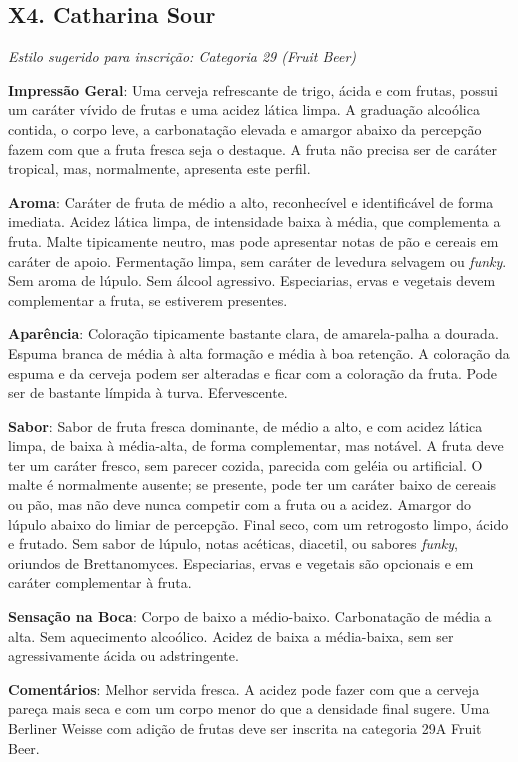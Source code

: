 \subsection*{X4. Catharina Sour}

\textit{Estilo sugerido para inscrição: Categoria 29 (Fruit Beer)}

\textbf{Impressão Geral}: Uma cerveja refrescante de trigo, ácida e com frutas, possui um caráter vívido de frutas e uma acidez lática limpa. A graduação alcoólica contida, o corpo leve, a carbonatação elevada e amargor abaixo da percepção fazem com que a fruta fresca seja o destaque. A fruta não precisa ser de caráter tropical, mas, normalmente, apresenta este perfil.

\textbf{Aroma}: Caráter de fruta de médio a alto, reconhecível e identificável de forma imediata. Acidez lática limpa, de intensidade baixa à média, que complementa a fruta. Malte tipicamente neutro, mas pode apresentar notas de pão e cereais em caráter de apoio. Fermentação limpa, sem caráter de levedura selvagem ou \textit{funky}. Sem aroma de lúpulo. Sem álcool agressivo. Especiarias, ervas e vegetais devem complementar a fruta, se estiverem presentes.

\textbf{Aparência}: Coloração tipicamente bastante clara, de amarela-palha a dourada. Espuma branca de média à alta formação e média à boa retenção. A coloração da espuma e da cerveja podem ser alteradas e ficar com a coloração da fruta. Pode ser de bastante límpida à turva. Efervescente.

\textbf{Sabor}: Sabor de fruta fresca dominante, de médio a alto, e com acidez lática limpa, de baixa à média-alta, de forma complementar, mas notável. A fruta deve ter um caráter fresco, sem parecer cozida, parecida com geléia ou artificial. O malte é normalmente ausente; se presente, pode ter um caráter baixo de cereais ou pão, mas não deve nunca competir com a fruta ou a acidez. Amargor do lúpulo abaixo do limiar de percepção. Final seco, com um retrogosto limpo, ácido e frutado. Sem sabor de lúpulo, notas acéticas, diacetil, ou sabores \textit{funky}, oriundos de Brettanomyces. Especiarias, ervas e vegetais são opcionais e em caráter complementar à fruta.

\textbf{Sensação na Boca}: Corpo de baixo a médio-baixo. Carbonatação de média a alta. Sem aquecimento alcoólico. Acidez de baixa a média-baixa, sem ser agressivamente ácida ou adstringente.

\textbf{Comentários}: Melhor servida fresca. A acidez pode fazer com que a cerveja pareça mais seca e com um corpo menor do que a densidade final sugere. Uma Berliner Weisse com adição de frutas deve ser inscrita na categoria 29A Fruit Beer.

